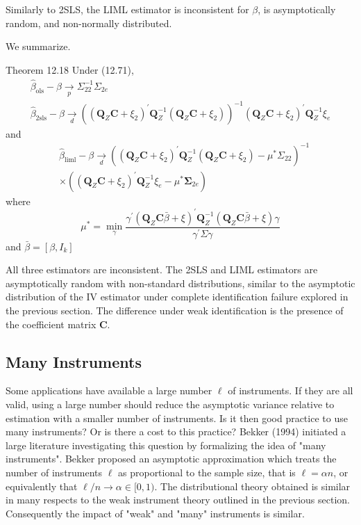 \documentclass[10pt]{article}
\begin{document}
Similarly to 2SLS, the LIML estimator is inconsistent for $\beta$, is asymptotically random, and non-normally distributed.

We summarize.

Theorem 12.18 Under (12.71),
$$
\begin{gathered}
\widehat{\beta}_{\mathrm{ols}}-\beta \underset{p}{\longrightarrow} \Sigma_{22}^{-1} \Sigma_{2 e} \\
\widehat{\beta}_{2 \mathrm{sls}}-\beta \underset{d}{\longrightarrow}\left(\left(\boldsymbol{Q}_{Z} \boldsymbol{C}+\xi_{2}\right)^{\prime} \boldsymbol{Q}_{Z}^{-1}\left(\boldsymbol{Q}_{Z} \boldsymbol{C}+\xi_{2}\right)\right)^{-1}\left(\boldsymbol{Q}_{Z} \boldsymbol{C}+\xi_{2}\right)^{\prime} \boldsymbol{Q}_{Z}^{-1} \xi_{e}
\end{gathered}
$$
and
$$
\begin{aligned}
&\widehat{\beta}_{\mathrm{liml}}-\beta \underset{d}{\longrightarrow}\left(\left(\boldsymbol{Q}_{Z} \boldsymbol{C}+\xi_{2}\right)^{\prime} \boldsymbol{Q}_{Z}^{-1}\left(\boldsymbol{Q}_{Z} \boldsymbol{C}+\xi_{2}\right)-\mu^{*} \Sigma_{22}\right)^{-1} \\
&\times\left(\left(\boldsymbol{Q}_{Z} \boldsymbol{C}+\xi_{2}\right)^{\prime} \boldsymbol{Q}_{Z}^{-1} \xi_{e}-\mu^{*} \boldsymbol{\Sigma}_{2 e}\right)
\end{aligned}
$$
where
$$
\mu^{*}=\min _{\gamma} \frac{\gamma^{\prime}\left(\boldsymbol{Q}_{Z} \boldsymbol{C} \bar{\beta}+\xi\right)^{\prime} \boldsymbol{Q}_{Z}^{-1}\left(\boldsymbol{Q}_{Z} \boldsymbol{C} \bar{\beta}+\xi\right) \gamma}{\gamma^{\prime} \Sigma \gamma}
$$
and $\bar{\beta}=\left[\beta, I_{k}\right]$

All three estimators are inconsistent. The 2SLS and LIML estimators are asymptotically random with non-standard distributions, similar to the asymptotic distribution of the IV estimator under complete identification failure explored in the previous section. The difference under weak identification is the presence of the coefficient matrix $\boldsymbol{C}$.

\subsection{Many Instruments}
Some applications have available a large number $\ell$ of instruments. If they are all valid, using a large number should reduce the asymptotic variance relative to estimation with a smaller number of instruments. Is it then good practice to use many instruments? Or is there a cost to this practice? Bekker (1994) initiated a large literature investigating this question by formalizing the idea of "many instruments". Bekker proposed an asymptotic approximation which treats the number of instruments $\ell$ as proportional to the sample size, that is $\ell=\alpha n$, or equivalently that $\ell / n \rightarrow \alpha \in[0,1)$. The distributional theory obtained is similar in many respects to the weak instrument theory outlined in the previous section. Consequently the impact of "weak" and "many" instruments is similar.
\end{document}
